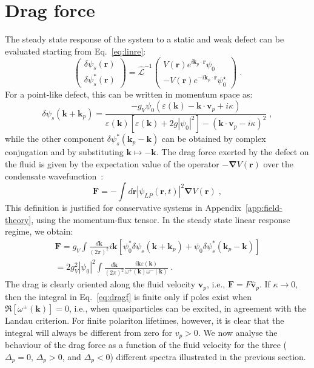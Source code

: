 \section{Drag force}
\label{sec:drag}
%
The steady state response of the system to a static and weak defect
can be evaluated starting from Eq.~\eqref{eq:linre}:
%
\begin{equation*}
  \begin{pmatrix} \delta \psi_s(\bm{r}) \\ \delta
    \psi_s^*(\bm{r}) \end{pmatrix} =
  \hat{\mathcal{L}}^{-1} \begin{pmatrix} V(\bm{r}) e^{i \bm{k}_p
      \cdot \bm{r}} \psi_0 \\ -V(\bm{r}) e^{-i \bm{k}_p \cdot
      \bm{r}} \psi_0^{\star} \end{pmatrix} \; .
\end{equation*}
%
For a point-like defect, this can be written in momentum space as:
%
\begin{equation*}
  \delta \psi_s (\bm{k} + \bm{k}_p) = \frac{-g_V \psi_0
    (\varepsilon(\bm{k}) - \bm{k} \cdot \bm{v}_p +
    i\kappa)}{\varepsilon(\bm{k}) [\varepsilon(\bm{k}) +
      2g|\psi_0|^2] - (\bm{k} \cdot \bm{v}_p - i\kappa)^2} \; ,
\end{equation*}
%
while the other component $\delta \psi_s^* (\bm{k}_p - \bm{k})$ can be
obtained by complex conjugation and by substituting
$\bm{k} \mapsto -\bm{k}$. The drag force exerted by the defect on the
fluid is given by the expectation value of the operator
$-\bm{\nabla}V(\bm{r})$ over the condensate
wavefunction~\cite{Pavloff2002}:
%
\begin{equation}
  \bm{F} = - \int d\bm{r} |\psi_{LP}(\bm{r},t)|^2 \bm{\nabla}V(\bm{r}) \; ,
\end{equation}
%
This definition is justified for conservative systems in
Appendix~\ref{app:field-theory}, using the momentum-flux tensor. In
the steady state linear response regime, we obtain:
%
\begin{multline}
  \bm{F} = g_V \int \frac{d\bm{k}}{(2\pi)^2} i\bm{k}
  \left[\psi_0^* \delta\psi_s (\bm{k} + \bm{k}_p) + \psi_0 \delta
    \psi_s^* (\bm{k}_p - \bm{k})\right]\\
%
  = 2g_V^2|\psi_0|^2 \int \frac{d\bm{k}}{(2\pi)^2} \frac{i\bm{k}
    \varepsilon(\bm{k})}{\omega^{+} (\bm{k})\omega^{-} (\bm{k})}
  \; .
    \label{eq:dragf}
\end{multline}
%
The drag is clearly oriented along the fluid velocity $\bm{v}_p$,
i.e., $\bm{F} = F \hat{\bm{v}}_p$. If $\kappa \to 0$, then the
integral in Eq.~\eqref{eq:dragf} is finite only if poles exist when
$\Re [\omega^{\pm} (\bm{k})] = 0$, i.e., when quasiparticles can be
excited, in agreement with the Landau criterion. For finite polariton
lifetimes, however, it is clear that the integral will always be
different from zero for $v_p>0$.
We now analyse the behaviour of the drag force as a function of the
fluid velocity for the three ($\Delta_p = 0$, $\Delta_p > 0$, and
$\Delta_p < 0$) different spectra illustrated in the previous section.

